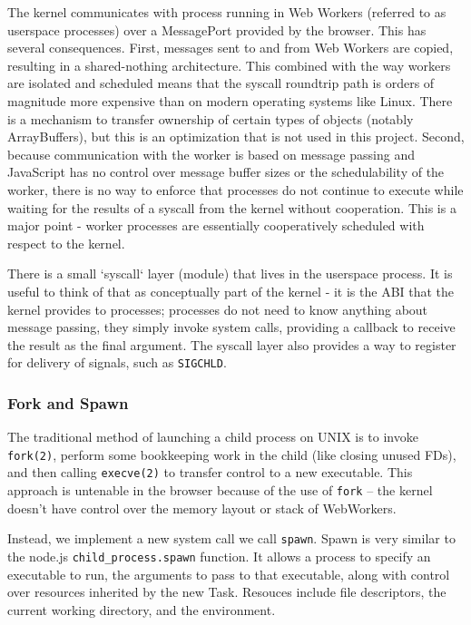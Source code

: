\documentclass{acm_proc_article-sp}
\begin{document}
The kernel communicates with process running in Web Workers (referred
to as userspace processes) over a MessagePort provided by the browser.
This has several consequences.  First, messages sent to and from Web
Workers are copied, resulting in a shared-nothing architecture.  This
combined with the way workers are isolated and scheduled means that
the syscall roundtrip path is orders of magnitude more expensive than
on modern operating systems like Linux. There is a mechanism to
transfer ownership of certain types of objects (notably ArrayBuffers),
but this is an optimization that is not used in this project.  Second,
because communication with the worker is based on message passing and
JavaScript has no control over message buffer sizes or the
schedulability of the worker, there is no way to enforce that
processes do not continue to execute while waiting for the results of
a syscall from the kernel without cooperation.  This is a major point
- worker processes are essentially cooperatively scheduled with
respect to the kernel.

There is a small `syscall` layer (module) that lives in the userspace
process.  It is useful to think of that as conceptually part of the
kernel - it is the ABI that the kernel provides to processes;
processes do not need to know anything about message passing, they
simply invoke system calls, providing a callback to receive the result
as the final argument.  The syscall layer also provides a way to
register for delivery of signals, such as \texttt{SIGCHLD}.

\subsubsection{Fork and Spawn}

The traditional method of launching a child process on UNIX is to
invoke \texttt{fork(2)}, perform some bookkeeping work in the child
(like closing unused FDs), and then calling \texttt{execve(2)} to
transfer control to a new executable.  This approach is untenable in
the browser because of the use of \texttt{fork} -- the kernel doesn't
have control over the memory layout or stack of WebWorkers.

Instead, we implement a new system call we call \texttt{spawn}.  Spawn
is very similar to the node.js \texttt{child\_process.spawn} function.
It allows a process to specify an executable to run, the arguments to
pass to that executable, along with control over resources inherited
by the new Task.  Resouces include file descriptors, the current
working directory, and the environment.
\end{document}

